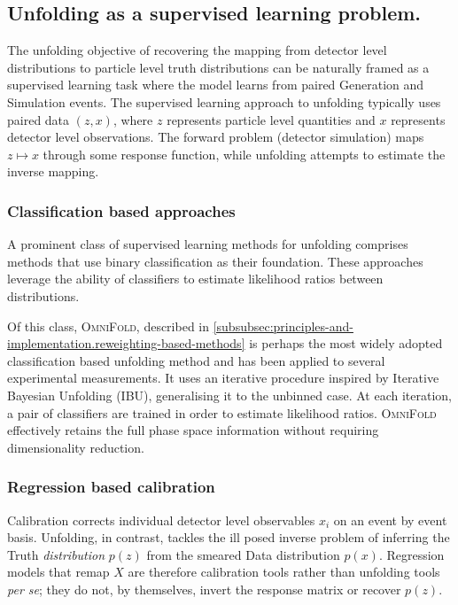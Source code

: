     \subsection{Unfolding as a supervised learning problem.}
        The unfolding objective of recovering the mapping from detector level distributions to particle level truth distributions can be naturally framed as a supervised learning task where the model learns from paired Generation and Simulation events.
        The supervised learning approach to unfolding typically uses paired data \((z, x)\), where \(z\) represents particle level quantities and \(x\) represents detector level observations.
        The forward problem (detector simulation) maps \(z \mapsto x\) through some response function, while unfolding attempts to estimate the inverse mapping.

        \subsubsection{Classification based approaches}
            A prominent class of supervised learning methods for unfolding comprises methods that use binary classification as their foundation.
            These approaches leverage the ability of classifiers to estimate likelihood ratios between distributions.
            
            Of this class, \textsc{OmniFold}, described in \cref{subsubsec:principles-and-implementation.reweighting-based-methods} is perhaps the most widely adopted classification based unfolding method and has been applied to several experimental measurements.
            It uses an iterative procedure inspired by Iterative Bayesian Unfolding (IBU), generalising it to the unbinned case.
            At each iteration, a pair of classifiers are trained in order to estimate likelihood ratios.
            \textsc{OmniFold} effectively retains the full phase space information without requiring dimensionality reduction.
            
        \subsubsection{Regression based calibration}
        \label{subsubsec:regression_calibration}
            Calibration corrects individual detector level observables \(x_i\) on an event by event basis.
            Unfolding, in contrast, tackles the ill posed inverse problem of inferring the Truth \emph{distribution} \(p(z)\) from the smeared Data distribution \(p(x)\).
            Regression models that remap \(X\) are therefore calibration tools rather than unfolding tools \textit{per se}; they do not, by themselves, invert the response matrix or recover \(p(z).\)
            
